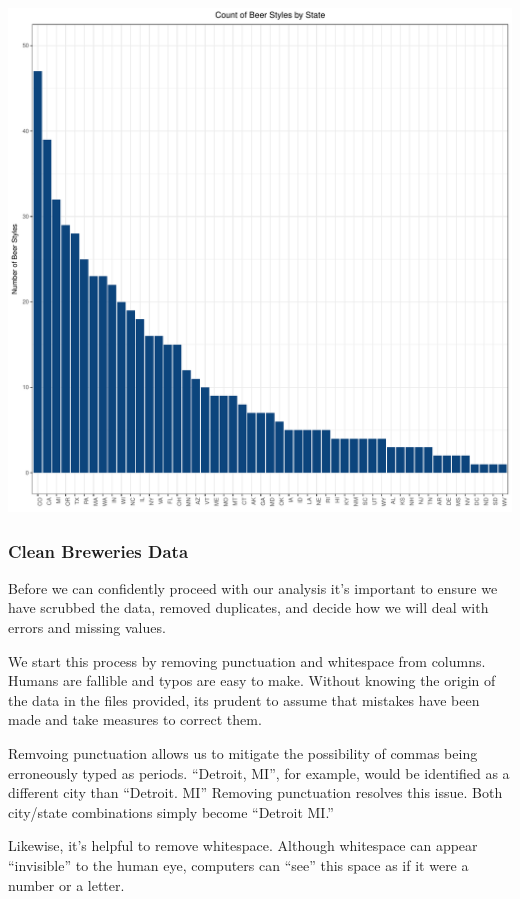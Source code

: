 \documentclass[]{article}
\begin{document}
\begin{center}\includegraphics{Analysis_Final_files/figure-latex/unnamed-chunk-3-1} \end{center}

\subsubsection{Clean Breweries Data}\label{clean-breweries-data}

Before we can confidently proceed with our analysis it's important to
ensure we have scrubbed the data, removed duplicates, and decide how we
will deal with errors and missing values.

We start this process by removing punctuation and whitespace from
columns. Humans are fallible and typos are easy to make. Without knowing
the origin of the data in the files provided, its prudent to assume that
mistakes have been made and take measures to correct them.

Remvoing punctuation allows us to mitigate the possibility of commas
being erroneously typed as periods. ``Detroit, MI'', for example, would
be identified as a different city than ``Detroit. MI'' Removing
punctuation resolves this issue. Both city/state combinations simply
become ``Detroit MI.''

Likewise, it's helpful to remove whitespace. Although whitespace can
appear ``invisible'' to the human eye, computers can ``see'' this space
as if it were a number or a letter.
\end{document}
